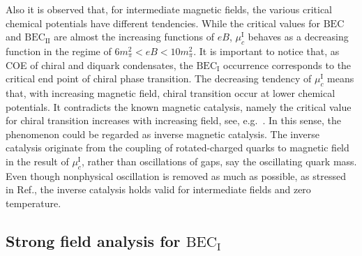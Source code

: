 \documentclass[prd, showpacs,nofootinbib,amsmath,amssymb,12pt]{revtex4}
\begin{document}
Also it is observed that, for intermediate magnetic fields, the various critical chemical potentials have different tendencies.
While the critical values for $\text{BEC}$ and $\text{BEC}_\text{II}$ are almost the increasing functions of $eB$,
$\mu_c^\text{I}$ behaves as a decreasing function in the regime of $6 m_\pi^2 <eB < 10 m_\pi^2$.
It is important to notice that, as COE of chiral and diquark condensates, the $\text{BEC}_\text{I}$ occurrence corresponds to the critical end point of chiral phase transition.
The decreasing tendency of $\mu_c^\text{I}$ means that, with increasing magnetic field, chiral transition occur at lower chemical potentials. It contradicts the known magnetic catalysis, namely the critical value for chiral transition increases with increasing field, see, e.g.~\cite{Gusynin1994Dimensional,Miransky2012Catalysis}. In this sense, the phenomenon could be regarded as inverse magnetic catalysis.
The inverse catalysis originate from the coupling of rotated-charged quarks to magnetic field in the result of $\mu^\text{I}_c$, rather than oscillations of gaps, say the oscillating quark mass. Even though nonphysical oscillation is removed as much as possible, as stressed in Ref.\cite{duarte2015bec}, the inverse catalysis holds valid for intermediate fields and zero temperature. 


\subsection{Strong  field analysis for  \texorpdfstring{$\text{BEC}_\text{I}$}{Lg} }
\label{sec:3c}
\end{document}
